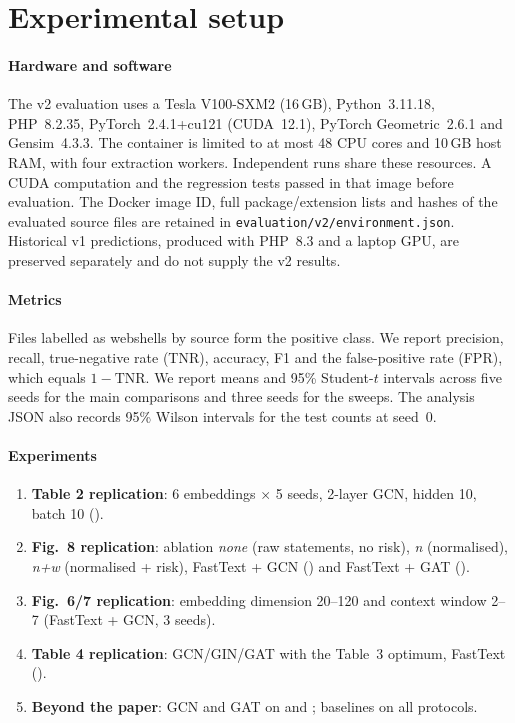 \section{Experimental setup}\label{sec:setup}
\paragraph{Hardware and software}
The v2 evaluation uses a Tesla V100-SXM2 (16\,GB), Python~3.11.18, PHP~8.2.35,
PyTorch~2.4.1+cu121 (CUDA~12.1), PyTorch Geometric~2.6.1 and Gensim~4.3.3.
The container is limited to at most 48 CPU cores and 10\,GB host RAM, with four extraction workers.
Independent runs share these resources. A CUDA computation and the regression tests passed in that image
before evaluation.
The Docker image ID, full package/extension lists and hashes of the evaluated source files are retained
in \texttt{evaluation/v2/environment.json}. Historical v1 predictions, produced with PHP~8.3 and a laptop GPU,
are preserved separately and do not supply the v2 results.

\paragraph{Metrics}
Files labelled as webshells by source form the positive class. We report precision, recall, true-negative rate
(TNR), accuracy, F1 and the false-positive rate (FPR), which equals $1-\mathrm{TNR}$. We report means and
95\% Student-$t$ intervals across five seeds for the main comparisons and three seeds for the sweeps.
The analysis JSON also records 95\% Wilson intervals for the \xs{} test counts at seed~0.

\paragraph{Experiments}
\begin{enumerate}
  \item \textbf{Table 2 replication}: 6 embeddings $\times$ 5 seeds, 2-layer GCN, hidden 10, batch 10 (\pr).
  \item \textbf{Fig.~8 replication}: ablation \emph{none} (raw statements, no risk), \emph{n} (normalised),
        \emph{n+w} (normalised + risk), FastText + GCN (\pr) and FastText + GAT (\cg).
  \item \textbf{Fig.~6/7 replication}: embedding dimension 20--120 and context window 2--7 (FastText + GCN, 3 seeds).
  \item \textbf{Table 4 replication}: GCN/GIN/GAT with the Table~3 optimum, FastText (\pr).
  \item \textbf{Beyond the paper}: GCN and GAT on \cg{} and \xs; baselines on all protocols.
\end{enumerate}

